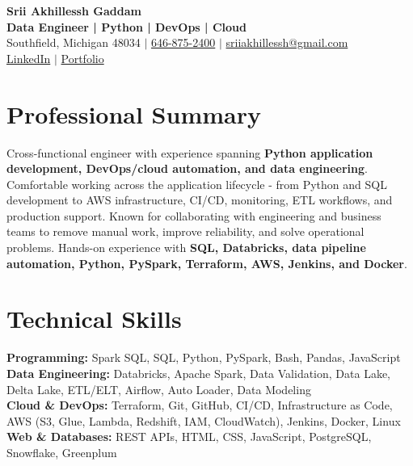 \documentclass[letterpaper,10pt]{article}
\begin{document}
\fontsize{9.35pt}{10.45pt}\selectfont

\begin{center}
    {\LARGE \textbf{Srii Akhillessh Gaddam}} \\[-1pt]
    \textbf{Data Engineer | Python | DevOps | Cloud} \\[2pt]
    Southfield, Michigan 48034 $|$
    \href{tel:6468752400}{646-875-2400} $|$
    \href{mailto:sriiakhillessh@gmail.com}{sriiakhillessh@gmail.com} \\[1pt]
    \href{https://www.linkedin.com/in/srii-akhiilessh-gaddam-b48668191/}{LinkedIn} $|$
    \href{https://sriiakhillesshg.github.io/portfolio/}{Portfolio}
\end{center}
\vspace{-8pt}

\section{Professional Summary}
\small{Cross-functional engineer with experience spanning \textbf{Python application development, DevOps/cloud automation, and data engineering}. Comfortable working across the application lifecycle - from Python and SQL development to AWS infrastructure, CI/CD, monitoring, ETL workflows, and production support. Known for collaborating with engineering and business teams to remove manual work, improve reliability, and solve operational problems. Hands-on experience with \textbf{SQL, Databricks, data pipeline automation, Python, PySpark, Terraform, AWS, Jenkins, and Docker}.}

\section{Technical Skills}
\small{
\textbf{Programming:} Spark SQL, SQL, Python, PySpark, Bash, Pandas, JavaScript \\
\textbf{Data Engineering:} Databricks, Apache Spark, Data Validation, Data Lake, Delta Lake, ETL/ELT, Airflow, Auto Loader, Data Modeling \\
\textbf{Cloud \& DevOps:} Terraform, Git, GitHub, CI/CD, Infrastructure as Code, AWS (S3, Glue, Lambda, Redshift, IAM, CloudWatch), Jenkins, Docker, Linux \\
\textbf{Web \& Databases:} REST APIs, HTML, CSS, JavaScript, PostgreSQL, Snowflake, Greenplum
}
\end{document}
